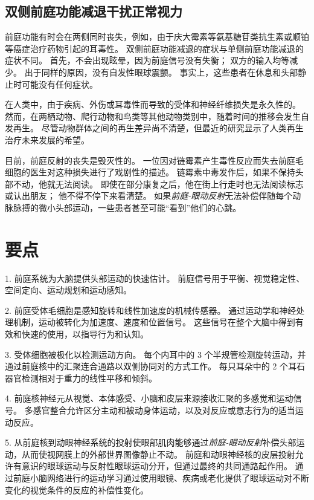 \subsection{双侧前庭功能减退干扰正常视力}

前庭功能有时会在两侧同时丧失，例如，由于庆大霉素等氨基糖苷类抗生素或顺铂等癌症治疗药物引起的耳毒性。
双侧前庭功能减退的症状与单侧前庭功能减退的症状不同。
首先，不会出现眩晕，因为前庭信号没有失衡；
双方的输入均等减少。
出于同样的原因，没有自发性眼球震颤。
事实上，这些患者在休息和头部静止时可能没有任何症状。


在人类中，由于疾病、外伤或耳毒性而导致的受体和神经纤维损失是永久性的。
然而，在两栖动物、爬行动物和鸟类等其他动物类别中，随着时间的推移会发生自发再生。
尽管动物群体之间的再生差异尚不清楚，但最近的研究显示了人类再生治疗未来发展的希望。


目前，前庭反射的丧失是毁灭性的。
一位因对链霉素产生毒性反应而失去前庭毛细胞的医生对这种损失进行了戏剧性的描述。
链霉素中毒发作后，如果不保持头部不动，他就无法阅读。
即使在部分康复之后，他在街上行走时也无法阅读标志或认出朋友；
他不得不停下来看清楚。
如果\textit{前庭-眼动反射}无法补偿伴随每个动脉脉搏的微小头部运动，一些患者甚至可能“看到”他们的心跳。



\section{要点}

1. 前庭系统为大脑提供头部运动的快速估计。
前庭信号用于平衡、视觉稳定性、空间定向、运动规划和运动感知。


2. 前庭受体毛细胞是感知旋转和线性加速度的机械传感器。
通过运动学和神经处理机制，运动被转化为加速度、速度和位置信号。
这些信号在整个大脑中得到有效和快速的使用，以指导行为和认知。


3. 受体细胞被极化以检测运动方向。
每个内耳中的 3 个半规管检测旋转运动，并通过前庭核中的汇聚连合通路以双侧协同对的方式工作。
每只耳朵中的 2 个耳石器官检测相对于重力的线性平移和倾斜。


4. 前庭核神经元从视觉、本体感受、小脑和皮层来源接收汇聚的多感觉和运动信号。
多感官整合允许区分主动和被动身体运动，以及对反应或意志行为的适当运动反应。


5. 从前庭核到动眼神经系统的投射使眼部肌肉能够通过\textit{前庭-眼动反射}补偿头部运动，从而使视网膜上的外部世界图像静止不动。
前庭和动眼神经核的皮层投射允许有意识的眼球运动与反射性眼球运动分开，但通过最终的共同通路起作用。
通过前庭小脑网络进行的运动学习通过使用眼镜、疾病或老化提供了眼球运动对不断变化的视觉条件的反应的补偿性变化。



